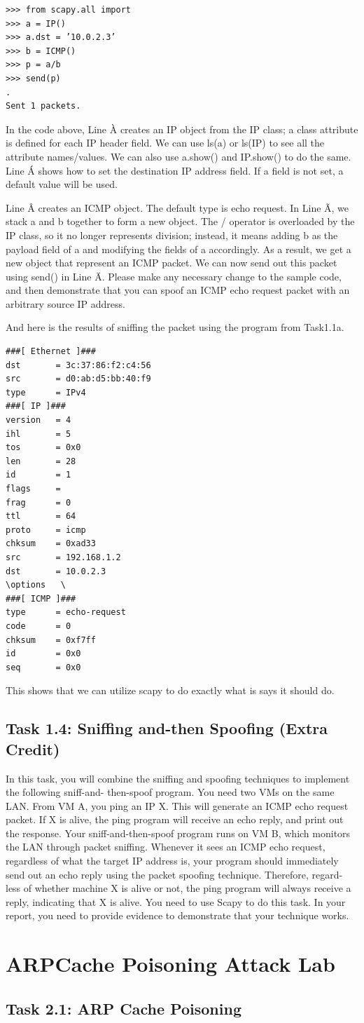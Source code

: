 \documentclass[12pt]{article}
\begin{document}
\begin{verbatim}
>>> from scapy.all import
>>> a = IP()
>>> a.dst = ’10.0.2.3’
>>> b = ICMP()
>>> p = a/b
>>> send(p)
.
Sent 1 packets.
\end{verbatim}
In the code above, Line À creates an IP object from the IP class; a class attribute is defined for each IP
header field. We can use ls(a) or ls(IP) to see all the attribute names/values. We can also use a.show()
and IP.show() to do the same. Line Á shows how to set the destination IP address field. If a field is not set,
a default value will be used.

Line Â creates an ICMP object. The default type is echo request. In Line Ã, we stack a and b together
to form a new object. The / operator is overloaded by the IP class, so it no longer represents division;
instead, it means adding b as the payload field of a and modifying the fields of a accordingly. As a result,
we get a new object that represent an ICMP packet. We can now send out this packet using send() in
Line Ä. Please make any necessary change to the sample code, and then demonstrate that you can spoof an
ICMP echo request packet with an arbitrary source IP address.


And here is the results of sniffing the packet using the program from Task1.1a.
\begin{verbatim}
###[ Ethernet ]###
dst       = 3c:37:86:f2:c4:56
src       = d0:ab:d5:bb:40:f9
type      = IPv4
###[ IP ]###
version   = 4
ihl       = 5
tos       = 0x0
len       = 28
id        = 1
flags     =
frag      = 0
ttl       = 64
proto     = icmp
chksum    = 0xad33
src       = 192.168.1.2
dst       = 10.0.2.3
\options   \
###[ ICMP ]###
type      = echo-request
code      = 0
chksum    = 0xf7ff
id        = 0x0
seq       = 0x0
\end{verbatim}

This shows that we can utilize scapy to do exactly what is says it should do.




\subsection{Task 1.4: Sniffing and-then Spoofing (Extra Credit)}
In this task, you will combine the sniffing and spoofing techniques to implement the following sniff-and-
then-spoof program. You need two VMs on the same LAN. From VM A, you ping an IP X. This will
generate an ICMP echo request packet. If X is alive, the ping program will receive an echo reply, and
print out the response. Your sniff-and-then-spoof program runs on VM B, which monitors the LAN through
packet sniffing. Whenever it sees an ICMP echo request, regardless of what the target IP address is, your
program should immediately send out an echo reply using the packet spoofing technique. Therefore, regard-
less of whether machine X is alive or not, the ping program will always receive a reply, indicating that X
is alive. You need to use Scapy to do this task. In your report, you need to provide evidence to demonstrate
that your technique works.





\section{ARPCache Poisoning Attack Lab}
\subsection{Task 2.1: ARP Cache Poisoning}
\end{document}

